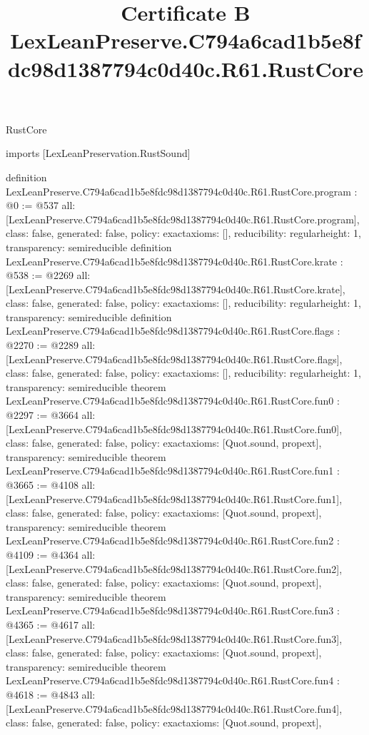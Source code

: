 \begin{lexlean}{RustCore}
\title{Certificate B LexLeanPreserve.C794a6cad1b5e8fdc98d1387794c0d40c.R61.RustCore}
\begin{coremodule}
imports [LexLeanPreservation.RustSound]

definition LexLeanPreserve.C794a6cad1b5e8fdc98d1387794c0d40c.R61.RustCore.program : @0 := @537 {
  all: [LexLeanPreserve.C794a6cad1b5e8fdc98d1387794c0d40c.R61.RustCore.program],
  class: false,
  generated: false,
  policy: exact{axioms: []},
  reducibility: regular{height: 1},
  transparency: semireducible
}
definition LexLeanPreserve.C794a6cad1b5e8fdc98d1387794c0d40c.R61.RustCore.krate : @538 := @2269 {
  all: [LexLeanPreserve.C794a6cad1b5e8fdc98d1387794c0d40c.R61.RustCore.krate],
  class: false,
  generated: false,
  policy: exact{axioms: []},
  reducibility: regular{height: 1},
  transparency: semireducible
}
definition LexLeanPreserve.C794a6cad1b5e8fdc98d1387794c0d40c.R61.RustCore.flags : @2270 := @2289 {
  all: [LexLeanPreserve.C794a6cad1b5e8fdc98d1387794c0d40c.R61.RustCore.flags],
  class: false,
  generated: false,
  policy: exact{axioms: []},
  reducibility: regular{height: 1},
  transparency: semireducible
}
theorem LexLeanPreserve.C794a6cad1b5e8fdc98d1387794c0d40c.R61.RustCore.fun0 : @2297 := @3664 {
  all: [LexLeanPreserve.C794a6cad1b5e8fdc98d1387794c0d40c.R61.RustCore.fun0],
  class: false,
  generated: false,
  policy: exact{axioms: [Quot.sound, propext]},
  transparency: semireducible
}
theorem LexLeanPreserve.C794a6cad1b5e8fdc98d1387794c0d40c.R61.RustCore.fun1 : @3665 := @4108 {
  all: [LexLeanPreserve.C794a6cad1b5e8fdc98d1387794c0d40c.R61.RustCore.fun1],
  class: false,
  generated: false,
  policy: exact{axioms: [Quot.sound, propext]},
  transparency: semireducible
}
theorem LexLeanPreserve.C794a6cad1b5e8fdc98d1387794c0d40c.R61.RustCore.fun2 : @4109 := @4364 {
  all: [LexLeanPreserve.C794a6cad1b5e8fdc98d1387794c0d40c.R61.RustCore.fun2],
  class: false,
  generated: false,
  policy: exact{axioms: [Quot.sound, propext]},
  transparency: semireducible
}
theorem LexLeanPreserve.C794a6cad1b5e8fdc98d1387794c0d40c.R61.RustCore.fun3 : @4365 := @4617 {
  all: [LexLeanPreserve.C794a6cad1b5e8fdc98d1387794c0d40c.R61.RustCore.fun3],
  class: false,
  generated: false,
  policy: exact{axioms: [Quot.sound, propext]},
  transparency: semireducible
}
theorem LexLeanPreserve.C794a6cad1b5e8fdc98d1387794c0d40c.R61.RustCore.fun4 : @4618 := @4843 {
  all: [LexLeanPreserve.C794a6cad1b5e8fdc98d1387794c0d40c.R61.RustCore.fun4],
  class: false,
  generated: false,
  policy: exact{axioms: [Quot.sound, propext]},
}
\end{coremodule}
\end{lexlean}
